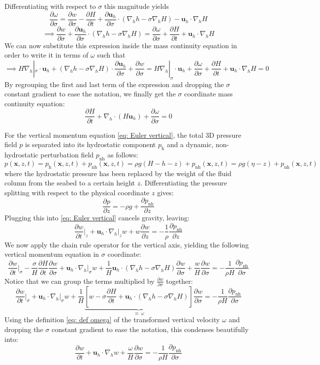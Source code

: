 \documentclass{article}
\newcommand{\uh}{\mathbf{u}_h}
\newcommand{\nablah}{\nabla_h}
\newcommand{\pnh}{p_{\text{nh}}}
\newcommand{\ddt}[1]{\frac{\partial #1}{\partial t}}
\newcommand{\dds}[1]{\frac{\partial #1}{\partial \sigma}}
\begin{document}
Differentiating with respect to $\sigma$ this magnitude yields
$$\dds{\omega} = \dds{w} - \ddt{H} +\dds{\uh} \cdot \left(\nablah h - \sigma \nablah H\right) - \uh \cdot  \nablah H$$
$$\implies \dds{w} + \dds{\uh} \cdot \left(\nablah h - \sigma \nablah H\right) = \dds{\omega} + \ddt{H} + \uh \cdot  \nablah H$$
We can now substitute this expression inside the mass continuity equation in order to write it in terms of $\omega$ such that
$$\implies H \nablah|_{\sigma} \cdot \uh + \left(\nablah h - \sigma \nablah H\right) \cdot \dds{\uh} + \dds{w} = H \nablah|_{\sigma} \cdot \uh +\dds{\omega} + \ddt{H} + \uh \cdot  \nablah H = 0 $$
By regrouping the first and last term of the expression and dropping the $\sigma$ constant gradient to ease the notation, we finally get the $\sigma$ coordinate mass continuity equation:
\begin{equation*}
    \boxed{\ddt{H} + \nablah \cdot \left(H\uh\right) +\dds{\omega}  = 0}
\end{equation*} 

For the vertical momentum equation \eqref{eq: Euler vertical}, the total 3D pressure field $p$ is separated into its hydrostatic component $p_{\text{h}}$ and a dynamic, non-hydrostatic perturbation field $\pnh$ as follows:
\begin{equation}
    p(\mathbf{x}, z, t) = p_{\text{h}}(\mathbf{x}, z, t) + \pnh(\mathbf{x}, z, t) = \rho g (H - h - z) + \pnh(\mathbf{x}, z, t) = \rho g (\eta - z) + \pnh(\mathbf{x}, z, t)
    \label{eq: pressure split}
\end{equation}
where the hydrostatic pressure has been replaced by the weight of the fluid column from the seabed to a certain height $z$.
Differentiating the pressure splitting with respect to the physical coordinate $z$ gives:
$$\frac{\partial p}{\partial z} = -\rho g + \frac{\partial \pnh}{\partial z}$$
Plugging this into \eqref{eq: Euler vertical} cancels gravity, leaving:
$$\ddt{w}\bigg|_z + \uh \cdot \nablah|_z w + w \frac{\partial w}{\partial z} = -\frac{1}{\rho}\frac{\partial \pnh}{\partial z}$$
We now apply the chain rule operator for the vertical axis, yielding the following vertical momentum equation in $\sigma$ coordinate:
$$\ddt{w}\bigg|_{\sigma} - \frac{\sigma}{H}\ddt{H}\dds{w} + \uh \cdot \nablah|_\sigma w + \frac{1}{H}\uh \cdot \left(\nablah h - \sigma \nablah H\right)\dds{w} + \frac{w}{H} \dds{w} = -\frac{1}{\rho H}\dds{\pnh}$$
Notice that we can group the terms multiplied by $\dds{w}$ together:
$$\ddt{w}\bigg|_{\sigma} + \uh \cdot \nablah|_\sigma w + \frac{1}{H}\underbrace{\left[ w -\sigma\ddt{H} + \uh \cdot \left( \nablah h - \sigma \nablah H\right) \right]}_{\equiv\ \omega} \dds{w} = -\frac{1}{\rho H}\dds{\pnh}$$
Using the definition \eqref{eq: def omega} of the transformed vertical velocity $\omega$ and dropping the $\sigma$ constant gradient to ease the notation, this condenses beautifully into:
$$\boxed{\ddt{w} + \uh \cdot \nablah w + \frac{\omega}{H}\dds{w} = -\frac{1}{\rho H}\dds{\pnh}}$$
\end{document}
